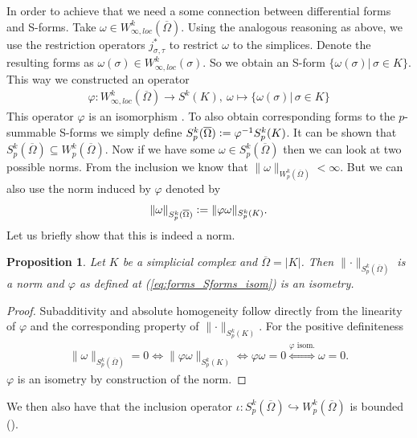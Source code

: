 \documentclass[12pt,a4paper]{article}
\numberwithin{equation}{subsection}
\numberwithin{lemma}{subsection}
\newtheorem{proposition}[lemma]{Proposition}
\theoremstyle{definition}
\newcommand{\norm}[2]{\lVert #1 \rVert_{#2}}
\newcommand{\omegabar}{\overline{\Omega}}
\begin{document}
In order to achieve that we need a some connection between differential forms
and S-forms. Take $\omega \in W_{\infty,loc}^k(\omegabar)$. Using the analogous
reasoning as above, we use the restriction operators $j^*_{\sigma,\tau}$ to 
restrict $\omega$ to the simplices. Denote the resulting 
forms as $\omega(\sigma) \in W^k_{\infty,loc}(\sigma)$. So we obtain an 
S-form $\{ \omega(\sigma) | \, \sigma \in K \}$. This way we constructed 
an operator 
\begin{align}
    \varphi: W_{\infty,loc}^k(\omegabar) \rightarrow S^k(K),\ \omega \mapsto 
    \{ \omega(\sigma) | \, \sigma \in K \} \label{eq:forms_Sforms_isom}
\end{align}
This 
operator $\varphi$ is an isomorphism \cite[Lemma~1]{goldshtein}. 
To also obtain corresponding forms to the $p$-summable S-forms we simply 
define $S^k_p(\omegabar) \vcentcolon= \varphi^{-1}S^k_p(K)$.
It can be shown that $S^k_p(\omegabar) \subseteq W^k_p(\omegabar)$.
Now if we have some $\omega \in S^k_p(\omegabar)$ then we can look at 
two possible norms. From the inclusion we know that 
$\norm{\omega}{W^k_p(\omegabar)} < \infty$. But we can also use the norm 
induced by $\varphi$ denoted by 
\begin{align}
    \norm{\omega}{S^k_p(\omegabar)} 
    \vcentcolon= \norm{\varphi \omega}{S^k_p(K)}. \label{eq:induced_norm}
\end{align}
Let us briefly show that this is indeed a norm.
\begin{proposition}
    Let $K$ be a simplicial complex and $\omegabar = |K|$. 
    Then $\norm{\cdot}{S^k_p(\omegabar)}$ 
    is a norm and $\varphi$ as defined at (\ref{eq:forms_Sforms_isom})  
    is an isometry.
\end{proposition}
\begin{proof}
    Subadditivity and absolute homogeneity follow directly from the linearity 
    of $\varphi$ and the corresponding property of $\norm{\cdot}{S^k_p(K)}$.
    For the positive definiteness 
    \begin{align*}
        \norm{\omega}{S^k_p(\omegabar)} = 0 
        \Leftrightarrow \norm{\varphi \omega}{S^k_p(K)}
        \Leftrightarrow \varphi \omega = 0
        \stackrel{\varphi \text{ isom.}}{\Leftrightarrow} \omega = 0.
    \end{align*}
    $\varphi$ is an isometry by construction of the norm.
\end{proof}
We then also have that the inclusion operator $\iota: S^k_p(\omegabar) 
\hookrightarrow W^k_p(\omegabar)$
is bounded (\cite[Lemma\,4]{goldshtein}). 
\end{document}
